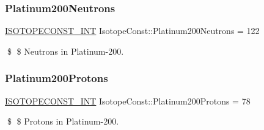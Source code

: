 \subsubsection{\texorpdfstring{Platinum200\+Neutrons}{Platinum200Neutrons}}
{\footnotesize\ttfamily \mbox{\hyperlink{group___isotope_const-_macros_ga5f18360b3e99483a35c32d789e62621c}{I\+S\+O\+T\+O\+P\+E\+C\+O\+N\+S\+T\+\_\+\+I\+NT}} Isotope\+Const\+::\+Platinum200\+Neutrons = 122}

\$ \$ Neutrons in Platinum-\/200. \mbox{\label{group___isotope_const-_platinum-_pt200_ga27d7046c1d586c2d274edc1bd9c1f705}} 
\subsubsection{\texorpdfstring{Platinum200\+Protons}{Platinum200Protons}}
{\footnotesize\ttfamily \mbox{\hyperlink{group___isotope_const-_macros_ga5f18360b3e99483a35c32d789e62621c}{I\+S\+O\+T\+O\+P\+E\+C\+O\+N\+S\+T\+\_\+\+I\+NT}} Isotope\+Const\+::\+Platinum200\+Protons = 78}

\$ \$ Protons in Platinum-\/200. 